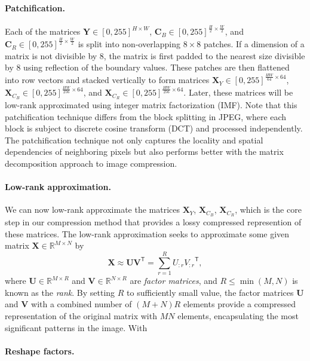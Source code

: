 \paragraph{Patchification.} 
Each of the matrices $\bm{Y} \in [0, 255]^{H \times W}$, $\bm{C}_B \in [0, 255]^{\frac{H}{2} \times \frac{W}{2}}$, and $\bm{C}_R \in [0, 255]^{\frac{H}{2} \times \frac{W}{2}}$ is split into non-overlapping $8 \times 8$ patches. If a dimension of a matrix is not divisible by 8, the matrix is first padded to the nearest size divisible by 8 using reflection of the boundary values. These patches are then flattened into row vectors and stacked vertically to form matrices $\bm{X}_{Y} \in [0, 255]^{\frac{HW}{64} \times 64}$, $\bm{X}_{C_B} \in [0, 255]^{\frac{HW}{256} \times 64}$, and $\bm{X}_{C_R} \in [0, 255]^{\frac{HW}{256} \times 64}$. Later, these matrices will be low-rank approximated using integer matrix factorization (IMF). Note that this patchification technique differs from the block splitting in JPEG, where each block is subject to discrete cosine transform (DCT) and processed independently. The patchification technique not only captures the locality and spatial dependencies of neighboring pixels but also performs better with the matrix decomposition approach to image compression.

\paragraph{Low-rank approximation.} We can now low-rank approximate the matrices $\bm{X}_{Y}$, $\bm{X}_{C_B}$, $\bm{X}_{C_R}$, which is the core step in our compression method that provides a lossy compressed represention of these matrices. The low-rank approximation \citep{eckart1936approximation} seeks to approximate some given matrix $ \mathbf{X} \in \mathbb{R}^{M \times N} $ by 
\begin{equation} \label{eq: lra}
	\bm{X} \approx \bm{U} \bm{V}^\mathsf{T} = \sum_{r=1}^{R} U_{:r} {V_{:r}}^\mathsf{T},
\end{equation} 
where $\bm{U} \in \mathbb{R}^{M \times R}$ and $\bm{V} \in \mathbb{R}^{N \times R}$ are \emph{factor matrices}, and $R \leq \min(M,N)$ is known as the \emph{rank}. By setting $R$ to sufficiently small value, the factor matrices $\bm{U}$ and $\bm{V}$ with a combined number of $(M+N)R$ elements provide a compressed representation of the original matrix with $MN$ elements, encapsulating the most significant patterns in the image. With

\paragraph{Reshape factors.}


